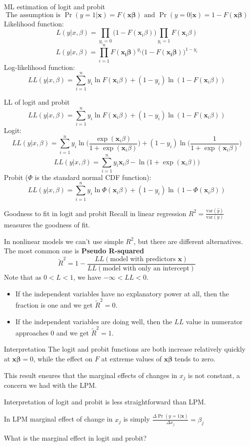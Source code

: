 \documentclass{beamer}
\begin{document}
\begin{frame}{ML estimation of logit and probit}
\[\text{The assumption is } \Pr (y=1|\mathbf{x})=F(\mathbf{x\beta})  \text{ and } \Pr (y=0|\mathbf{x})=1-F(\mathbf{x\beta}) \]
Likelihood function:\[L(y|x,\beta)=\prod_{y_i=0}\big(1-F(\mathbf{x}_i\beta)\big) \prod_{y_i=1}F(\mathbf{x}_i\beta) \]
\[L(y|x,\beta)=\prod_{i=1}^nF(\mathbf{x_i\beta})^{y_i}\big(1-F(\mathbf{x_i\beta})\big)^{1-y_i}  \]
Log-likelihood function:
\[LL(y|x,\beta)=\sum_{i=1}^n y_i\ln F(\mathbf{x}_i\beta)+(1-y_i)\ln(1-F(\mathbf{x}_i\beta)) \]

\end{frame}

\begin{frame}{LL of logit and probit}
\[LL(y|x,\beta)=\sum_{i=1}^n y_i\ln F(\mathbf{x}_i\beta)+(1-y_i)\ln(1-F(\mathbf{x}_i\beta)) \]
Logit: \[LL(y|x,\beta)=\sum_{i=1}^n y_i\ln \Big(\frac{\exp(\mathbf{x}_i\beta)}{1+\exp(\mathbf{x}_i\beta)} \Big)+(1-y_i)\ln \Big(\frac{1}{1+\exp(\mathbf{x}_i\beta)} \Big) \]
\[LL(y|x,\beta)=\sum_{i=1}^n y_i \mathbf{x}_i\beta-\ln\Big(1+\exp(\mathbf{x}_i\beta)\Big) \]
Probit ($\Phi$ is the standard normal CDF function): \[LL(y|x,\beta)=\sum_{i=1}^n y_i\ln \Phi(\mathbf{x}_i\beta)+(1-y_i)\ln(1-\Phi(\mathbf{x}_i\beta)) \]
\end{frame}

\begin{frame}{Goodness to fit in logit and probit}
Recall in linear regression $R^2=\frac{\text{var}(\hat{y})}{\text{var}(y)}$ measures the goodness of fit.\medskip

In nonlinear models we can't use simple $R^2$, but there are different alternatives. The most common one is \textbf{Pseudo R-squared}
\[ \tilde{R}^2=1-\frac{LL(\text{model with predictors } \mathbf{x})}{LL(\text{model with only an intercept})} \] \medskip
Note that as $0<L<1$, we have $-\infty<LL<0$.
\begin{itemize}
\item If the independent variables have no explanatory power at all, then the fraction is one and we get $\tilde{R}^2 = 0$.
\item If the independent variables are doing well, then the $LL$ value in numerator approaches 0 and we get $\tilde{R}^2 = 1$.
\end{itemize}
\end{frame}

\begin{frame}{Interpretation }
The logit and probit functions are both increase relatively quickly at $\mathbf{x\beta}=0$, while the effect on $F$ at extreme values of $\mathbf{x\beta}$ tends to zero.\medskip

This result ensures that the marginal effects of changes in $x_j$ is not constant, a concern we had with the LPM.\medskip

Interpretation of logit and probit is less straightforward than LPM.\bigskip

In LPM marginal effect of change in $x_j$ is simply $\displaystyle\frac{\Delta \Pr(y=1|\mathbf{x})}{\Delta x_j}=\beta_j$ \bigskip


What is the marginal effect in logit and probit?
\end{frame}
\end{document}
